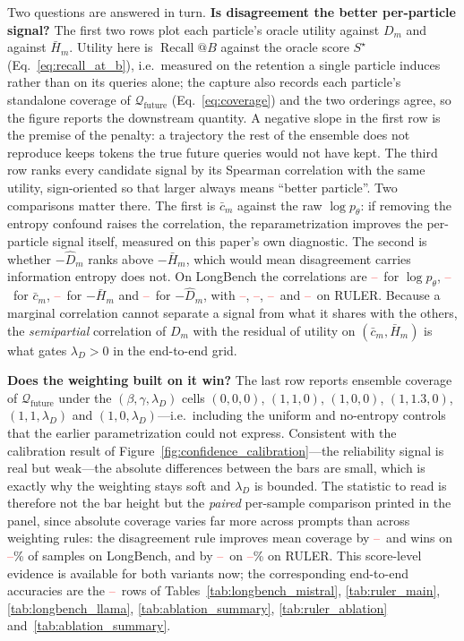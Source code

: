 \documentclass{article} %
\newcommand{\tbd}{\textcolor{red}{--}}
\begin{document}
Two questions are answered in turn. \textbf{Is disagreement the better per-particle signal?} The first two rows plot each particle's oracle utility against $D_m$ and against $\bar H_m$. Utility here is $\operatorname{Recall}@B$ against the oracle score $S^\star$ (Eq.~\eqref{eq:recall_at_b}), i.e.\ measured on the retention a single particle induces rather than on its queries alone; the capture also records each particle's standalone coverage of $\mathcal{Q}_{\mathrm{future}}$ (Eq.~\eqref{eq:coverage}) and the two orderings agree, so the figure reports the downstream quantity. A negative slope in the first row is the premise of the penalty: a trajectory the rest of the ensemble does not reproduce keeps tokens the true future queries would not have kept. The third row ranks every candidate signal by its Spearman correlation with the same utility, sign-oriented so that larger always means ``better particle''. Two comparisons matter there. The first is $\bar c_m$ against the raw $\log p_\theta$: if removing the entropy confound raises the correlation, the reparametrization improves the per-particle signal itself, measured on this paper's own diagnostic. The second is whether $-\hat D_m$ ranks above $-\bar H_m$, which would mean disagreement carries information entropy does not. On LongBench the correlations are \tbd\ for $\log p_\theta$, \tbd\ for $\bar c_m$, \tbd\ for $-\bar H_m$ and \tbd\ for $-\hat D_m$, with \tbd, \tbd, \tbd\ and \tbd\ on RULER. Because a marginal correlation cannot separate a signal from what it shares with the others, the \emph{semipartial} correlation of $D_m$ with the residual of utility on $(\bar c_m,\bar H_m)$ is what gates $\lambda_D>0$ in the end-to-end grid.

\textbf{Does the weighting built on it win?} The last row reports ensemble coverage of $\mathcal{Q}_{\mathrm{future}}$ under the $(\beta,\gamma,\lambda_D)$ cells $(0,0,0)$, $(1,1,0)$, $(1,0,0)$, $(1,1.3,0)$, $(1,1,\lambda_D)$ and $(1,0,\lambda_D)$---i.e.\ including the uniform and no-entropy controls that the earlier parametrization could not express. Consistent with the calibration result of Figure~\ref{fig:confidence_calibration}---the reliability signal is real but weak---the absolute differences between the bars are small, which is exactly why the weighting stays soft and $\lambda_D$ is bounded. The statistic to read is therefore not the bar height but the \emph{paired} per-sample comparison printed in the panel, since absolute coverage varies far more across prompts than across weighting rules: the disagreement rule improves mean coverage by \tbd\ and wins on \tbd\% of samples on LongBench, and by \tbd\ on \tbd\% on RULER. This score-level evidence is available for both variants now; the corresponding end-to-end accuracies are the \tbd\ rows of Tables~\ref{tab:longbench_mistral}, \ref{tab:ruler_main}, \ref{tab:longbench_llama}, \ref{tab:ablation_summary}, \ref{tab:ruler_ablation} and~\ref{tab:ablation_summary}.
\end{document}
